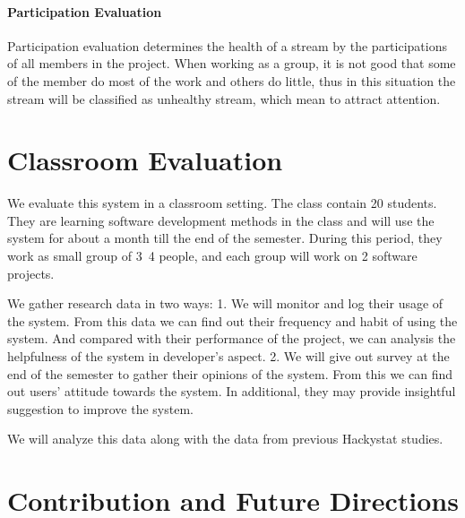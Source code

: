 \subsubsection{Participation Evaluation}
Participation evaluation determines the health of a stream by the participations of all members in the project. When working as a group, it is not good that some of the member do most of the work and others do little, thus in this situation the stream will be classified as unhealthy stream, which mean to attract attention.

\chapter{Classroom Evaluation}
We evaluate this system in a classroom setting. The class contain 20 students. They are learning software development methods in the class and will use the system for about a month till the end of the semester. During this period, they work as small group of 3~4 people, and each group will work on 2 software projects.

We gather research data in two ways:
	1. We will monitor and log their usage of the system. From this data we can find out their frequency and habit of using the system. And compared with their performance of the project, we can analysis the helpfulness of the system in developer's aspect. 
	2. We will give out survey at the end of the semester to gather their opinions of the system. From this we can find out users' attitude towards the system. In additional, they may provide insightful suggestion to improve the system.

We will analyze this data along with the data from previous Hackystat studies.

\chapter{Contribution and Future Directions}
